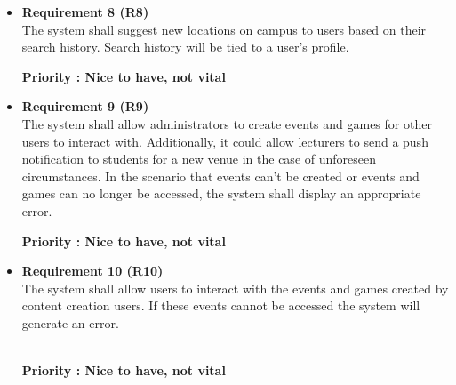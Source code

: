 \documentclass[english]{article}
\begin{document}
\begin{itemize}
					    \item \textbf{Requirement 8 (R8)}\\ The system shall suggest new locations on campus to users based on their search history. Search history will be tied to a user's profile.\\ 
						\begin{small}
						 \textbf{Priority : Nice to have, not vital}
						\end{small}											    
					    

					    \item \textbf{Requirement 9 (R9)}\\ The system shall allow administrators to create events and games for other users to interact with. Additionally, it could allow lecturers to send a push notification to students for a new venue in the case of unforeseen circumstances. In the scenario that events can't be created or events and games can no longer be accessed, the system shall display an appropriate error. \\
					    \begin{small}
					    \textbf{Priority : Nice to have, not vital}					    
					    \end{small}


					    \item \textbf{Requirement 10 (R10)} \\ The system shall allow users to interact with the events and games created by content creation users. If these events cannot be accessed the system will generate an error.
					    \begin{small}
					    \\ \textbf{Priority : Nice to have, not vital}					    					    
					    \end{small}




					\end{itemize}
\end{document}
